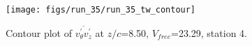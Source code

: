 \begin{figure}[H]
\centering
\texttt{[image: figs/run\_35/run\_35\_tw\_contour]}
\caption{Contour plot of $\overline{v_{\theta}^{\prime} v_{z}^{\prime}}$ at $z/c$=8.50, $V_{free}$=23.29, station 4.}
\label{fig:run_35_tw_contour}
\end{figure}


